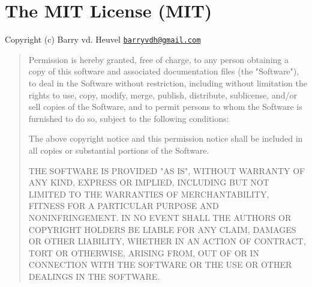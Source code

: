 \chapter{The MIT License (MIT) }
\hypertarget{md__c_1_2xampp_2htdocs_2_g_pagos_ayuntamiento_2vendor_2barryvdh_2laravel-ide-helper_2_l_i_c_e_n_s_e}{}\label{md__c_1_2xampp_2htdocs_2_g_pagos_ayuntamiento_2vendor_2barryvdh_2laravel-ide-helper_2_l_i_c_e_n_s_e}
\label{md__c_1_2xampp_2htdocs_2_g_pagos_ayuntamiento_2vendor_2barryvdh_2laravel-ide-helper_2_l_i_c_e_n_s_e_autotoc_md8661}%
%


Copyright (c) Barry vd. Heuvel \href{mailto:barryvdh@gmail.com}{\texttt{barryvdh@gmail.\+com}}

\begin{quote}
Permission is hereby granted, free of charge, to any person obtaining a copy of this software and associated documentation files (the "{}\+Software"{}), to deal in the Software without restriction, including without limitation the rights to use, copy, modify, merge, publish, distribute, sublicense, and/or sell copies of the Software, and to permit persons to whom the Software is furnished to do so, subject to the following conditions\+:

The above copyright notice and this permission notice shall be included in all copies or substantial portions of the Software.

THE SOFTWARE IS PROVIDED "{}\+AS IS"{}, WITHOUT WARRANTY OF ANY KIND, EXPRESS OR IMPLIED, INCLUDING BUT NOT LIMITED TO THE WARRANTIES OF MERCHANTABILITY, FITNESS FOR A PARTICULAR PURPOSE AND NONINFRINGEMENT. IN NO EVENT SHALL THE AUTHORS OR COPYRIGHT HOLDERS BE LIABLE FOR ANY CLAIM, DAMAGES OR OTHER LIABILITY, WHETHER IN AN ACTION OF CONTRACT, TORT OR OTHERWISE, ARISING FROM, OUT OF OR IN CONNECTION WITH THE SOFTWARE OR THE USE OR OTHER DEALINGS IN THE SOFTWARE. \end{quote}
